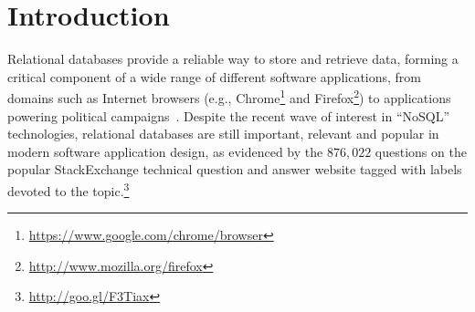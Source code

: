 
\section{Introduction}
\label{sec:introduction}










\begin{sloppypar}
  Relational databases provide a reliable way to store and retrieve data, forming a critical component of a wide range of different software applications, from domains such as Internet browsers (e.g., Chrome\footnote{\small{\url{https://www.google.com/chrome/browser}}} and Firefox\footnote{\small{\url{http://www.mozilla.org/firefox}}}) to applications powering political campaigns~\cite{Butler2012}. Despite the recent wave of interest in ``NoSQL'' technologies, relational databases are still important, relevant and popular in modern software application design, as evidenced by the $876,022$ questions on the popular StackExchange technical question and answer website tagged with labels devoted to the topic.\footnote{\small{\url{http://goo.gl/F3Tiax}}} %
\end{sloppypar}


